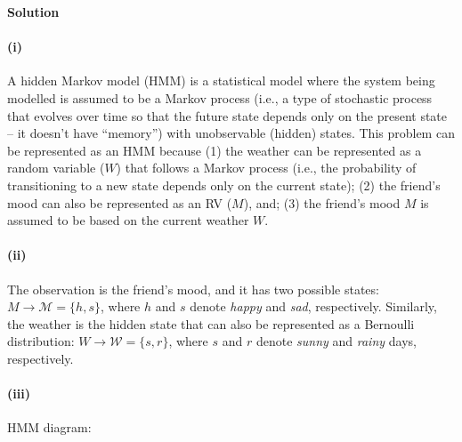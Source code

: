 \textbf{Solution} \\

\paragraph{(i)} A hidden Markov model (HMM) is a statistical model where the system being modelled is
assumed to be a Markov process (i.e., a type of stochastic process that evolves over time so
that the future state depends only on the present state – it doesn’t have “memory”) with
unobservable (hidden) states. This problem can be represented as an HMM because (1)
the weather can be represented as a random variable ($W$) that follows a Markov process
(i.e., the probability of transitioning to a new state depends only on the current state);
(2) the friend’s mood can also be represented as an RV ($M$), and; (3) the friend’s mood
$M$ is assumed to be based on the current weather $W$.

\paragraph{(ii)} The observation is the friend’s mood, and it has two possible states:
$M \rightarrow \mathcal{M}=\{h,s\}$, where $h$ and $s$ denote \emph{happy} and \emph{sad},
respectively.  Similarly, the weather is the hidden state that can also be represented as a
Bernoulli distribution: $W \rightarrow \mathcal{W}=\{s,r\}$, where $s$ and $r$ denote
\emph{sunny} and \emph{rainy} days, respectively.

\paragraph{(iii)} HMM diagram:

\begin{center}
\end{center}

